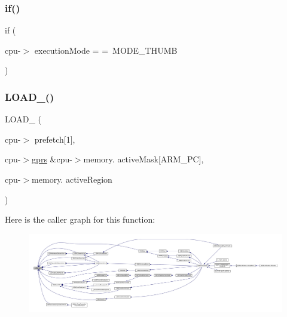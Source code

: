 \subsubsection{\texorpdfstring{if()}{if()}\hspace{0.1cm}{\footnotesize\ttfamily [3/3]}}
{\footnotesize\ttfamily if (\begin{DoxyParamCaption}\item[{cpu-\/$>$}]{execution\+Mode = {\ttfamily =~MODE\+\_\+THUMB} }\end{DoxyParamCaption})}

\mbox{\label{isa-arm_8c_a88524ff7478b7ba92867d9b915c600e4}} 
\subsubsection{\texorpdfstring{L\+O\+A\+D\+\_()}{LOAD\_32()}}
{\footnotesize\ttfamily L\+O\+A\+D\+\_ (\begin{DoxyParamCaption}\item[{cpu-\/$>$}]{prefetch\mbox{[}1\mbox{]},  }\item[{cpu-\/$>$\mbox{\hyperlink{isa-thumb_8c_a6b4b7e13a9a144391615b217c5917bc7}{gprs}} \&cpu-\/$>$memory.}]{active\+Mask\mbox{[}\+A\+R\+M\+\_\+\+P\+C\mbox{]},  }\item[{cpu-\/$>$memory.}]{active\+Region }\end{DoxyParamCaption})}

Here is the caller graph for this function\+:
\nopagebreak
\begin{figure}[H]
\begin{center}
\leavevmode
\includegraphics[width=350pt]{isa-arm_8c_a88524ff7478b7ba92867d9b915c600e4_icgraph}
\end{center}
\end{figure}
\mbox{\label{isa-arm_8c_a2f2276eb553941abea041ba983b46e77}} 
